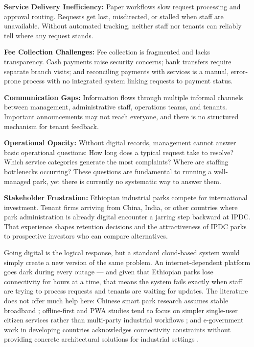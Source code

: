 \textbf{Service Delivery Inefficiency:} Paper workflows slow request processing and approval routing. Requests get lost, misdirected, or stalled when staff are unavailable. Without automated tracking, neither staff nor tenants can reliably tell where any request stands.

\textbf{Fee Collection Challenges:} Fee collection is fragmented and lacks transparency. Cash payments raise security concerns; bank transfers require separate branch visits; and reconciling payments with services is a manual, error-prone process with no integrated system linking requests to payment status.

\textbf{Communication Gaps:} Information flows through multiple informal channels between management, administrative staff, operations teams, and tenants. Important announcements may not reach everyone, and there is no structured mechanism for tenant feedback.

\textbf{Operational Opacity:} Without digital records, management cannot answer basic operational questions: How long does a typical request take to resolve? Which service categories generate the most complaints? Where are staffing bottlenecks occurring? These questions are fundamental to running a well-managed park, yet there is currently no systematic way to answer them.

\textbf{Stakeholder Frustration:} Ethiopian industrial parks compete for international investment. Tenant firms arriving from China, India, or other countries where park administration is already digital encounter a jarring step backward at IPDC. That experience shapes retention decisions and the attractiveness of IPDC parks to prospective investors who can compare alternatives.

Going digital is the logical response, but a standard cloud-based system would simply create a new version of the same problem. An internet-dependent platform goes dark during every outage --- and given that Ethiopian parks lose connectivity for hours at a time, that means the system fails exactly when staff are trying to process requests and tenants are waiting for updates. The literature does not offer much help here: Chinese smart park research assumes stable broadband \citep{Yang2023, Wang2022}; offline-first and PWA studies tend to focus on simpler single-user citizen services rather than multi-party industrial workflows \citep{Cherukuri2024, Muawwal2024}; and e-government work in developing countries acknowledges connectivity constraints without providing concrete architectural solutions for industrial settings \citep{Denbu2019, Lessa2019}.


